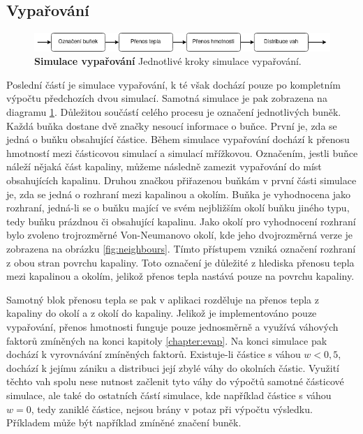 \subsection{Vypařování}
\label{chapter:simEvap}

\begin{figure}[hbt]
	\centering
	\captionsetup{justification=centering}
	\includegraphics[scale=0.6]{obrazky-figures/EvapFlow.png}
	\caption{\textbf{Simulace vypařování} Jednotlivé kroky simulace vypařování.}
	\label{fig:EvapFlow}
\end{figure}

Poslední částí je simulace vypařování, k té však dochází pouze po kompletním výpočtu předchozích dvou simulací. Samotná simulace je pak zobrazena na diagramu \ref{fig:EvapFlow}. Důležitou součástí celého procesu je označení jednotlivých buněk. Každá buňka dostane dvě značky nesoucí informace o buňce. První je, zda se jedná o buňku obsahující částice. Během simulace vypařování dochází k přenosu hmotností mezi částicovou simulací a simulací mřížkovou. Označením, jestli buňce náleží nějaká část kapaliny, můžeme následně zamezit vypařování do míst obsahujících kapalinu. Druhou značkou přiřazenou buňkám v první části simulace je, zda se jedná o rozhraní mezi kapalinou a okolím. Buňka je vyhodnocena jako rozhraní, jedná-li se o buňku mající ve svém nejbližším okolí buňku jiného typu, tedy buňku prázdnou či obsahující kapalinu. Jako okolí pro vyhodnocení rozhraní bylo zvoleno trojrozměrné Von-Neumanovo okolí, kde jeho dvojrozměrná verze je zobrazena na obrázku \ref{fig:neighbours}. Tímto přístupem vzniká označení rozhraní z obou stran povrchu kapaliny. Toto označení je důležité z hlediska přenosu tepla mezi kapalinou a okolím, jelikož přenos tepla nastává pouze na povrchu kapaliny. 

Samotný blok přenosu tepla se pak v aplikaci rozděluje na přenos tepla z kapaliny do okolí a z okolí do kapaliny. Jelikož je implementováno pouze vypařování, přenos hmotnosti funguje pouze jednosměrně a využívá váhových faktorů zmíněných na konci kapitoly \ref{chapter:evap}. Na konci simulace pak dochází k vyrovnávání zmíněných faktorů. Existuje-li částice s váhou $w < 0,5$, dochází k jejímu zániku a distribuci její zbylé váhy do okolních částic. Využití těchto vah spolu nese nutnost začlenit tyto váhy do výpočtů samotné částicové simulace, ale také do ostatních částí simulace, kde například částice s váhou $w = 0$, tedy zaniklé částice, nejsou brány v potaz při výpočtu výsledku. Příkladem může být například zmíněné značení buněk.

